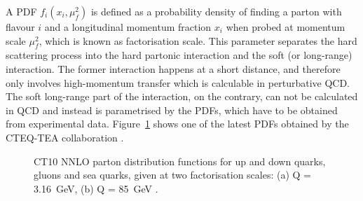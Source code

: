A PDF $f_i(x_i,\mu_f^2)$ is defined as a probability density of finding a parton with flavour $i$ and a longitudinal
momentum fraction $x_i$ when probed at momentum scale $\mu_f^2$, which is known as factorisation scale. This parameter
separates the hard scattering process into the hard partonic interaction and the soft (or long-range) interaction. The
former interaction happens at a short distance, and therefore only involves high-momentum transfer which is calculable
in perturbative QCD. The soft long-range part of the interaction, on the contrary, can not be calculated in QCD and
instead is parametrised by the PDFs, which have to be obtained from experimental data. Figure~\ref{fig:CT10_PDFs} shows
one of the latest PDFs obtained by the CTEQ-TEA collaboration \autocite{CT10_NNLO}.

\begin{figure}[hbtp]
   \centering
   \caption[CT10 NNLO parton distribution functions]{CT10 NNLO parton distribution functions for up and down quarks,
   gluons and sea quarks, given at two factorisation scales: (a) Q = \SI{3.16}{\GeV}, (b) Q = \SI{85}{\GeV}
   \autocite{CT10_NNLO}.}
   \label{fig:CT10_PDFs}
\end{figure}

